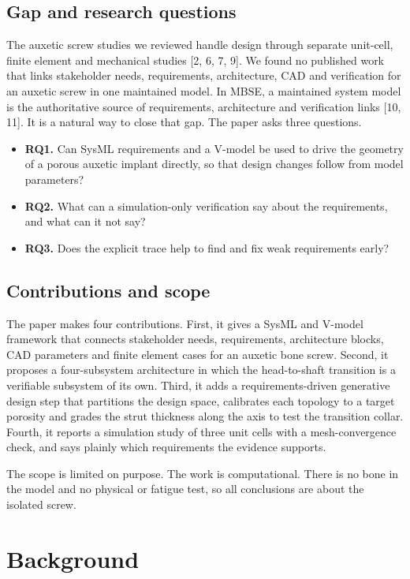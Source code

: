 \documentclass[10pt,twocolumn,letterpaper]{article}
\begin{document}
\subsection{Gap and research questions}
The auxetic screw studies we reviewed handle design through separate unit-cell, finite element and mechanical studies [2, 6, 7, 9]. We found no published work that links stakeholder needs, requirements, architecture, CAD and verification for an auxetic screw in one maintained model. In MBSE, a maintained system model is the authoritative source of requirements, architecture and verification links [10, 11]. It is a natural way to close that gap. The paper asks three questions.

\begin{itemize}
\item \textbf{RQ1.} Can SysML requirements and a V-model be used to drive the geometry of a porous auxetic implant directly, so that design changes follow from model parameters?
\item \textbf{RQ2.} What can a simulation-only verification say about the requirements, and what can it not say?
\item \textbf{RQ3.} Does the explicit trace help to find and fix weak requirements early?
\end{itemize}
\subsection{Contributions and scope}
The paper makes four contributions. First, it gives a SysML and V-model framework that connects stakeholder needs, requirements, architecture blocks, CAD parameters and finite element cases for an auxetic bone screw. Second, it proposes a four-subsystem architecture in which the head-to-shaft transition is a verifiable subsystem of its own. Third, it adds a requirements-driven generative design step that partitions the design space, calibrates each topology to a target porosity and grades the strut thickness along the axis to test the transition collar. Fourth, it reports a simulation study of three unit cells with a mesh-convergence check, and says plainly which requirements the evidence supports.

The scope is limited on purpose. The work is computational. There is no bone in the model and no physical or fatigue test, so all conclusions are about the isolated screw.


\section{Background}
\end{document}
